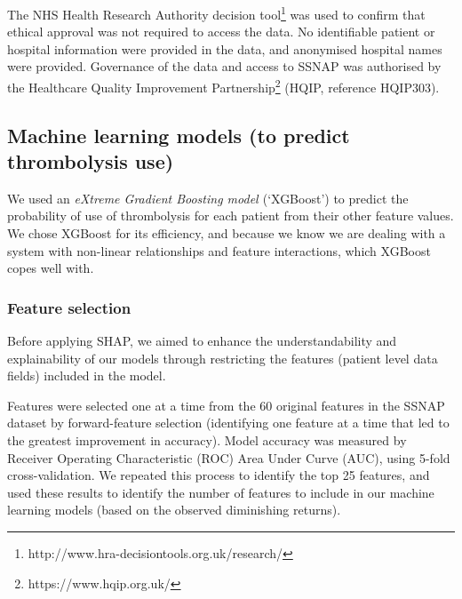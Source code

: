 The NHS Health Research Authority decision tool\footnote{http://www.hra-decisiontools.org.uk/research/} was used to confirm that ethical approval was not required to access the data. No identifiable patient or hospital information were provided in the data, and anonymised hospital names were provided. Governance of the data and access to SSNAP was authorised by the Healthcare Quality Improvement Partnership\footnote{https://www.hqip.org.uk/} (HQIP, reference HQIP303). 

\subsection{Machine learning models (to predict thrombolysis use)}
We used an \emph{eXtreme Gradient Boosting model \cite{chen_xgboost_2016}} (`XGBoost') to predict the probability of use of thrombolysis for each patient from their other feature values. We chose XGBoost for its efficiency, and because we know we are dealing with a system with non-linear relationships and feature interactions, which XGBoost copes well with.

\subsubsection{Feature selection}
Before applying SHAP, we aimed to enhance the understandability and explainability of our models through restricting the features (patient level data fields) included in the model. 

Features were selected one at a time from the 60 original features in the SSNAP dataset by forward-feature selection \cite{ferri_comparative_1994} (identifying one feature at a time that led to the greatest improvement in accuracy). Model accuracy was measured by Receiver Operating Characteristic (ROC) Area Under Curve (AUC), using 5-fold cross-validation. We repeated this process to identify the top 25 features, and used these results to identify the number of features to include in our machine learning models (based on the observed diminishing returns).


